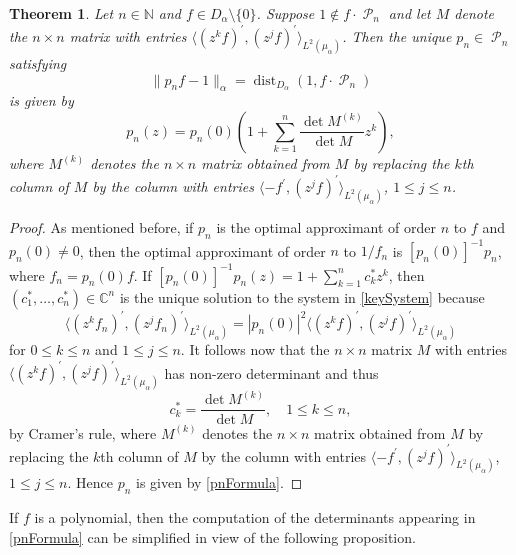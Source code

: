 \documentclass[11 pt,reqno]{amsart}
\newtheorem{thm}{Theorem}[section]
\theoremstyle{definition}
\theoremstyle{remark}
\numberwithin{equation}{section} \numberwithin{figure}{section}
\newcommand{\CC}{{\mathbb C}}
\newcommand{\NN}{{\mathbb N}}
\DeclareMathOperator{\Pol}{{\mathcal P}}
\DeclareMathOperator{\dist}{dist}
\begin{document}
\begin{thm}\label{t-LINEAR}
            Let $n\in\NN$ and $f\in D_{\alpha}\setminus\{0\}$.  Suppose
            $1\notin f\cdot\Pol_{n}$ and let $M$ denote the $n\times n$ matrix with entries
            $\langle (z^{k} f)^{\prime},(z^{j}f)^{\prime}\rangle_{L^{2}(\mu_{\alpha})}$.  Then
            the unique $p_{n}\in\Pol_{n}$ satisfying
            \[  \|p_{n}f-1\|_{\alpha}=\dist_{D_{\alpha}}(1,f\cdot\Pol_{n})  \]
            is given by
            \begin{equation}\label{pnFormula}
                        p_{n}(z)=p_{n}(0) \left( 1 +\sum_{k=1}^{n} \frac{\det M^{(k)}}{\det M}z^{k}\right),
            \end{equation}
            where $M^{(k)}$ denotes the $n\times n$ matrix obtained from $M$ by replacing the
            $k$th column of $M$ by the column with entries
            $\langle -f^{\prime}, (z^{j} f)^{\prime}\rangle_{L^{2}(\mu_{\alpha})}$, $1\leq j\leq n$.
\end{thm}
\begin{proof}
      As mentioned before, if $p_n$ is the optimal approximant of order $n$ to $f$ and
      $p_{n}(0)\neq 0$, then the optimal approximant of order $n$ to $1/f_n$
      is $[p_{n}(0)]^{-1}p_{n}$, where
      $f_{n}=p_{n}(0)f$.  If $[p_{n}(0)]^{-1}p_{n}(z)
      =1+\sum_{k=1}^{n}c_{k}^{*}z^{k}$, then $(c_1^{*},\ldots,c_n^{*})\in\CC^{n}$ is
      the unique solution to the system in \eqref{keySystem} because
      \[  \langle (z^{k} f_{n})^{\prime},(z^{j}f_{n})^{\prime}\rangle_{L^{2}(\mu_{\alpha})}
                    =|p_{n}(0)|^{2}\langle (z^{k} f)^{\prime},(z^{j}f)^{\prime}\rangle_{L^{2}(\mu_{\alpha})}    \]
      for $0\leq k\leq n$ and $1\leq j\leq n$.  It follows now that the $n\times n$ matrix
      $M$ with entries $\langle (z^{k} f)^{\prime},(z^{j}f)^{\prime}\rangle_{L^{2}(\mu_{\alpha})}$
      has non-zero determinant and thus
      \[  c_{k}^{*}=\frac{\det M^{(k)}}{\det M},\quad 1\leq k\leq n,  \]
      by Cramer's rule, where $M^{(k)}$ denotes the $n\times n$ matrix obtained from $M$
      by replacing the $k$th column of $M$ by the column with entries
      $\langle -f^{\prime}, (z^{j} f)^{\prime}\rangle_{L^{2}(\mu_{\alpha})}$,
      $1\leq j\leq n$.  Hence $p_{n}$ is given by \eqref{pnFormula}.
\end{proof}

If $f$ is a polynomial, then the computation of the determinants appearing in
\eqref{pnFormula} can be simplified in view of the following proposition.
\end{document}
